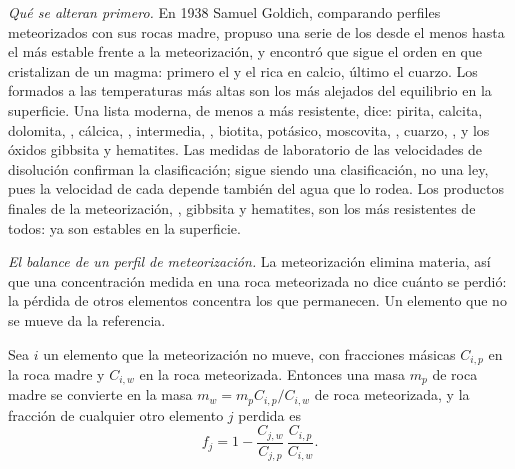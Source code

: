 \emph{Qué  se alteran primero.} En 1938 Samuel Goldich, comparando perfiles meteorizados con sus rocas madre, propuso una serie
de los  desde el menos hasta el más estable frente a la meteorización, y encontró que sigue el orden en que cristalizan de un
magma: primero el  y el  rica en calcio, último el cuarzo. Los  formados a las temperaturas más altas son los más
alejados del equilibrio en la superficie. Una lista moderna, de menos a más resistente, dice: pirita, calcita, dolomita, , 
cálcica, ,  intermedia, , biotita,  potásico, moscovita, , cuarzo, , y los óxidos
gibbsita y hematites. Las medidas de laboratorio de las velocidades de disolución confirman la clasificación; sigue siendo una clasificación,
no una ley, pues la velocidad de cada  depende también del agua que lo rodea. Los productos finales de la meteorización, ,
gibbsita y hematites, son los más resistentes de todos: ya son estables en la superficie.

\emph{El balance de un perfil de meteorización.} La meteorización elimina materia, así que una concentración medida en una roca meteorizada no
dice cuánto se perdió: la pérdida de otros elementos concentra los que permanecen. Un elemento que no se mueve da la referencia.

\begin{proposition}\label{prop:b1:weathering-clays:immobile}
Sea $i$ un elemento que la meteorización no mueve, con fracciones másicas
$C_{i,p}$ en la roca madre y $C_{i,w}$ en la roca meteorizada. Entonces una masa
$m_p$ de roca madre se convierte en la masa $m_w = m_p C_{i,p}/C_{i,w}$ de roca
meteorizada, y la fracción de cualquier otro elemento $j$ perdida es
\[
  f_j = 1 - \frac{C_{j,w}}{C_{j,p}}\,\frac{C_{i,p}}{C_{i,w}} .
\]
\end{proposition}

